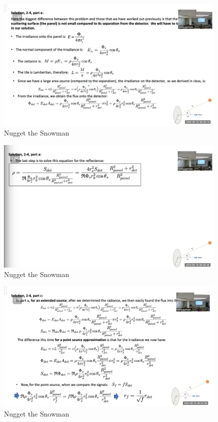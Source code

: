 \documentclass{article}
\begin{document}
\begin{figure}[h!]
\centering
\includegraphics[scale=.6]{Radiometry/Week4/Notes/PSET2/P4/P4.png}
\caption{Nugget the Snowman}
\label{fig:P4}
\end{figure}


\begin{figure}[h!]
\centering
\includegraphics[scale=.6]{Radiometry/Week4/Notes/PSET2/P4/P4a.png}
\caption{Nugget the Snowman}
\label{fig:P4}
\end{figure}

\begin{figure}[h!]
\centering
\includegraphics[scale=.6]{Radiometry/Week4/Notes/PSET2/P4/P4aa.png}
\caption{Nugget the Snowman}
\label{fig:P4}
\end{figure}
\end{document}
